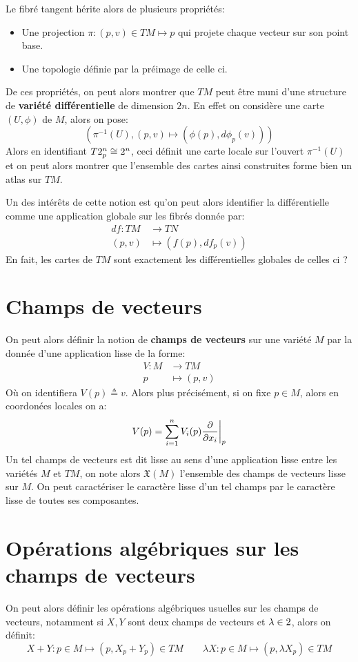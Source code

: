    Le fibré tangent hérite alors de plusieurs propriétés:
   \begin{itemize}
      \item Une projection \( \pi : (p, v) \in TM \mapsto p\) qui projete chaque vecteur sur son point base.
      \item Une topologie définie par la préimage de celle ci.
   \end{itemize}
   De ces propriétés, on peut alors montrer que \( TM \) peut être muni d'une structure de \textbf{variété différentielle} de dimension \( 2n \). En effet on considère une carte \( (U, \phi) \) de \( M \), alors on pose:
   \[ 
      \left(\pi^{-1}(U), (p, v) \mapsto (\phi(p), d\phi_p(v)) \right)
   \]
   Alors en identifiant \( T2^n_p \cong 2^n \), ceci définit une carte locale sur l'ouvert \(\pi^{-1}(U)\) et on peut alors montrer que l'ensemble des cartes ainsi construites forme bien un atlas sur \( TM \).\<

   Un des intérêts de cette notion est qu'on peut alors identifier la différentielle comme une application globale sur les fibrés donnée par:
   \[ 
      \begin{aligned}
         df : TM &\longrightarrow TN \\
         (p, v) &\longmapsto (f(p), df_p(v))
      \end{aligned} 
   \]
   En fait, les cartes de \( TM \) sont exactement les différentielles globales de celles ci ?
   \section{Champs de vecteurs}
   On peut alors définir la notion de \textbf{champs de vecteurs} sur une variété \( M \) par la donnée d'une application lisse de la forme:
   \[ 
      \begin{aligned}
         V : M &\longrightarrow TM \\
         p &\longmapsto (p, v)
      \end{aligned} 
   \]
   Où on identifiera \( V(p) \triangleq v \). Alors plus précisément, si on fixe \( p \in M \), alors en coordonées locales on a:
   \[ 
      V(p) = \sum_{i = 1}^n V_i(p) \frac{\partial }{\partial x_i}\biggr|_p
   \]
   Un tel champs de vecteurs est dit lisse au sens d'une application lisse entre les variétés \( M \) et \( TM \), on note alors $\mathfrak{X}(M) $ l'ensemble des champs de vecteurs lisse sur \( M \). On peut caractériser le caractère lisse d'un tel champs par le caractère lisse de toutes ses composantes.
   \section{Opérations algébriques sur les champs de vecteurs}
      On peut alors définir les opérations algébriques usuelles sur les champs de vecteurs, notamment si \( X, Y \) sont deux champs de vecteurs et \( \lambda \in 2 \), alors on définit:
      \[ 
         X + Y : p \in M \longmapsto (p, X_p + Y_p) \in TM \quad\quad \lambda X: p \in M \longmapsto (p, \lambda X_p) \in TM
      \]

